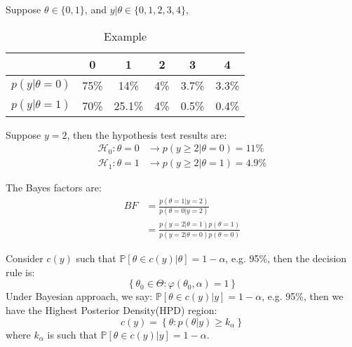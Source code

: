 \begin{eg}
    
Suppose $\theta \in \{0, 1\}$, and $y | \theta \in \{ 0,1,2,3,4 \}$,
\begin{table}[H]
    \centering
    \begin{tabular}{c|ccccc}
        \toprule
         & 0 & 1 & 2 & 3 & 4 \\
        \midrule
        $p(y | \theta = 0)$ & 75\% & 14\% & 4\% & 3.7\% & 3.3\% \\
        $p(y | \theta = 1)$ & 70\% & 25.1\% & 4\% & 0.5\% & 0.4\% \\
        \bottomrule
    \end{tabular}
    \caption{Example}
    \label{tab:example}
\end{table}

Suppose $y=2$, then the hypothesis test results are:
\begin{align}
    \mathcal{H}_0: \theta = 0 & \to p(y \geq 2 | \theta = 0) = 11\% \\
    \mathcal{H}_1: \theta = 1 & \to p(y \geq 2 | \theta = 1) = 4.9\%
\end{align}

The Bayes factors are:
\begin{align}
    BF &= \frac{p\left(\theta = 1 | y = 2 \right)}{p\left(\theta = 0 | y = 2 \right)} \\
    &= \frac{p(y = 2 | \theta = 1)p(\theta = 1)}{p(y = 2 | \theta = 0)p(\theta = 0)}
\end{align}

\end{eg}

Consider $c(y)$ such that $\mathbb{P}\left[ \theta \in c(y) | \theta \right] = 1- \alpha $, e.g. 95\%,
then the decision rule is:
\begin{equation}
    \left\{ \theta_0 \in \Theta : \varphi(\theta_0, \alpha ) = 1 \right\}
\end{equation}
Under Bayesian approach, we say:  $\mathbb{P}\left[ \theta \in c(y) | y \right] = 1- \alpha $, e.g. 95\%,
then we have the Highest Posterior Density(HPD) region:
\begin{equation}
    c(y) = \left\{ \theta : p(\theta | y) \geq k_\alpha  \right\}
\end{equation}
where $k_\alpha $ is such that $\mathbb{P}\left[ \theta \in c(y) | y \right] = 1- \alpha $.

